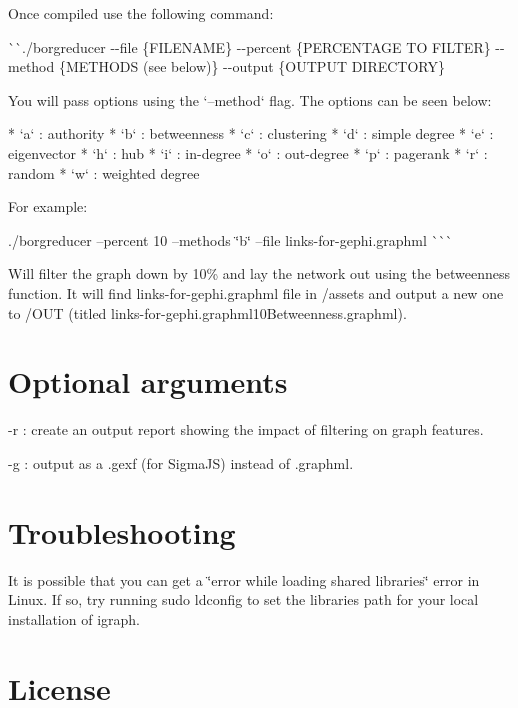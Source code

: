 Once compiled use the following command\+:

\`{}\`{}{\ttfamily  ./borgreducer -\/-\/file \{F\+I\+L\+E\+N\+A\+ME\} -\/-\/percent \{P\+E\+R\+C\+E\+N\+T\+A\+GE TO F\+I\+L\+T\+ER\} -\/-\/method \{M\+E\+T\+H\+O\+DS (see below)\} -\/-\/output \{O\+U\+T\+P\+UT D\+I\+R\+E\+C\+T\+O\+RY\}} 
\begin{DoxyCode}
You will pass options using the `--method` flag. The options can be seen below:

* `a` : authority
* `b` : betweenness
* `c` : clustering
* `d` : simple degree
* `e` : eigenvector
* `h` : hub
* `i` : in-degree
* `o` : out-degree
* `p` : pagerank
* `r` : random
* `w` : weighted degree

For example:
\end{DoxyCode}
 ./borgreducer --percent 10 --methods \char`\"{}b\char`\"{} --file links-\/for-\/gephi.\+graphml \`{}\`{}\`{}

Will filter the graph down by 10\% and lay the network out using the betweenness function. It will find {\ttfamily links-\/for-\/gephi.\+graphml} file in {\ttfamily /assets} and output a new one to {\ttfamily /\+O\+UT} (titled {\ttfamily links-\/for-\/gephi.\+graphml10\+Betweenness.\+graphml}).

\section*{Optional arguments}


\begin{DoxyItemize}
\item {\ttfamily -\/r} \+: create an output report showing the impact of filtering on graph features.
\item {\ttfamily -\/g} \+: output as a .gexf (for Sigma\+JS) instead of .graphml.
\end{DoxyItemize}

\section*{Troubleshooting}

It is possible that you can get a \char`\"{}error while loading shared libraries\char`\"{} error in Linux. If so, try running {\ttfamily sudo ldconfig} to set the libraries path for your local installation of igraph.

\section*{License}

